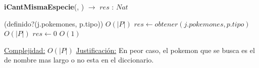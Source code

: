 \begin{algorithm}[H]{\textbf{iCantMismaEspecie}(, ) $\to$ $res$ : $Nat$} 
	{}
	\begin{algorithmic}
		\If(definido?(j.pokemones, p.tipo)) \Comment $O(|P|)$
		\State $res \gets obtener(j.pokemones, p.tipo)$ \Comment $O(|P|)$
		\Else
		\State $res \gets 0 $ \Comment $O(1)$
		\EndIf
	
		\medskip
		\Statex \underline{Complejidad:} $O(|P|)$
		\Statex \underline{Justificación:} En peor caso, el pokemon que se busca es el de nombre mas largo o no esta en el diccionario.
    \end{algorithmic}
\end{algorithm}